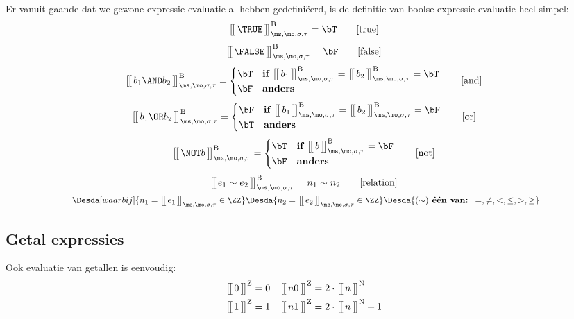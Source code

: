 Er vanuit gaande dat we gewone expressie evaluatie al hebben gedefiniëerd, is de definitie van boolse expressie evaluatie heel simpel:
%
\begin{equation}
  \Express[B]{\TRUE}{\ms,\mo,\sigma,\tau} = \bT
  \tag*{[true]}
\end{equation}
%
\begin{equation}
  \Express[B]{\FALSE}{\ms,\mo,\sigma,\tau} = \bF
  \tag*{[false]}
\end{equation}
%
\begin{equation}
  \Express[B]{b_1 \AND b_2}{\ms,\mo,\sigma,\tau}
  = \begin{cases}
    \bT & \textbf{if } \Express[B]{b_1}{\ms,\mo,\sigma,\tau} = \Express[B]{b_2}{\ms,\mo,\sigma,\tau} = \bT \\
    \bF & \textbf{anders}
  \end{cases}
  \tag*{[and]}
\end{equation}
%
\begin{equation}
  \Express[B]{b_1 \OR b_2}{\ms,\mo,\sigma,\tau}
  = \begin{cases}
    \bF & \textbf{if } \Express[B]{b_1}{\ms,\mo,\sigma,\tau} = \Express[B]{b_2}{\ms,\mo,\sigma,\tau} = \bF \\
    \bT & \textbf{anders}
  \end{cases}
  \tag*{[or]}
\end{equation}
%
\begin{equation}
  \Express[B]{\NOT b}{\ms,\mo,\sigma,\tau}
  = \begin{cases}
    \bT & \textbf{if } \Express[B]{b}{\ms,\mo,\sigma,\tau} = \bF \\
    \bF & \textbf{anders}
  \end{cases}
  \tag*{[not]}
\end{equation}
%
\begin{gather*}
  \Express[B]{e_1 \sim e_2}{\ms,\mo,\sigma,\tau} =
  n_1 \sim n_2
  \tag*{[relation]} \\
  \Desdas{
    \Desda[waarbij]{n_1 = \Express{e_1}{\ms,\mo,\sigma,\tau} \in \ZZ}
    \Desda{n_2 = \Express{e_2}{\ms,\mo,\sigma,\tau} \in \ZZ}
    \Desda{(\sim) \textbf{ één van: } =, \neq, <, \le, >, \ge}
  }
\end{gather*}

\subsection{Getal expressies}

Ook evaluatie van getallen is eenvoudig:
%
\begin{align*}
  \Express[Z]{0}{} &= 0 &
  \Express[Z]{n 0}{} &= 2 \cdot \Express[N]{n}{} \\
  \Express[Z]{1}{} &= 1 &
  \Express[Z]{n 1}{} &= 2 \cdot \Express[N]{n}{} + 1
\end{align*}

